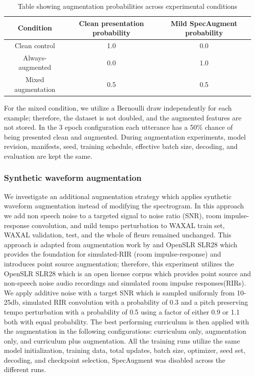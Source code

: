 {\begin{table}[htbp]
    \centering
    \begin{tabular}{|c|c|c|}
        \hline
        Condition & Clean presentation probability & Mild SpecAugment probability \\
        \hline
        Clean control & 1.0 & 0.0 \\
        \hline
        Always-augmented & 0.0 & 1.0 \\
        \hline
        Mixed augmentation & 0.5 & 0.5 \\
        \hline
    \end{tabular}
    \caption{Table showing augmentation probabilities across experimental conditions}
    \label{tab:augmentation_probabilities}
\end{table}

For the mixed condition, we utilize a Bernoulli draw independently for each example; therefore, the dataset is not doubled, and the augmented features are not stored. In the 3 epoch configuration each utterance has a 50\% chance of being presented clean and augmented.
During augmentation experiments, model revision, manifests, seed, training schedule, effective batch size, decoding, and evaluation are kept the same. 

\subsubsection{Synthetic waveform augmentation}

We investigate an additional augmentation strategy which applies synthetic waveform augmentation instead of modifying the spectrogram. In this approach we add non speech noise to a targeted signal to noise ratio (SNR), room impulse-response convolution, and mild tempo perturbation to WAXAL train set, WAXAL validation, test, and the whole of fleurs remained unchanged.
This approach is adapted from augmentation work by \citep{Ko2017} and OpenSLR SLR28 which provides the foundation for simulated-RIR (room impulse-response) and introduces point source augmentation; therefore, this experiment utilizes the OpenSLR SLR28 which is an open license corpus which provides point source and non-speech noise audio recordings and simulated room impulse responses(RIRs). We apply additive noise with a target SNR which is sampled uniformly from 10-25db, simulated RIR convolution with a probability of 0.3 and a pitch preserving tempo perturbation with a probability of 0.5 using a factor of either 0.9 or 1.1 both with equal probability.  
The best performing curriculum is then applied with the augmentation in the following configurations: curriculum only, augmentation only, and curriculum plus augmentation. All the training runs utilize the same model initialization, training data, total updates, batch size, optimizer, seed set, decoding, and checkpoint selection, SpecAugment was disabled across the different runs. 

}
